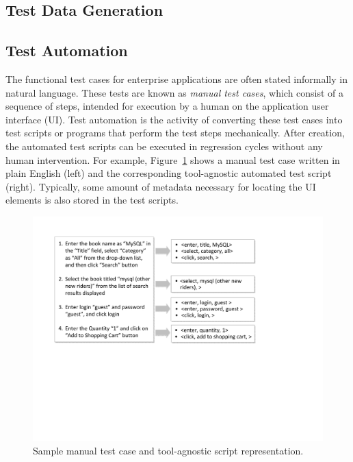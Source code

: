 \subsection{Test Data Generation}
\label{sec:test-data}



\subsection{Test Automation}
\label{sec:test-automation}

The functional test cases for enterprise applications are often stated
informally in natural language. These tests are known as \textit{manual test
  cases}, which consist of a sequence of steps, intended for execution by a
human on the application user interface (UI).  Test automation is the activity
of converting these test cases into test scripts or programs that perform the
test steps mechanically. After creation, the automated test scripts can be
executed in regression cycles without any human intervention. For example,
Figure~\ref{fig:sample-test-case} shows a manual test case written in plain
English (left) and the corresponding tool-agnostic automated test script
(right). Typically, some amount of metadata necessary for locating the UI
elements is also stored in the test scripts.

\begin{figure}[t]
\centering
\includegraphics[width=\columnwidth, clip, trim = 21mm 93mm 65mm
  18mm]{figs/sample-test-case.pdf}
\vspace*{-15pt}
\caption{Sample manual test case and tool-agnostic script representation.}
\vspace*{-10pt}
\label{fig:sample-test-case}
\end{figure}

